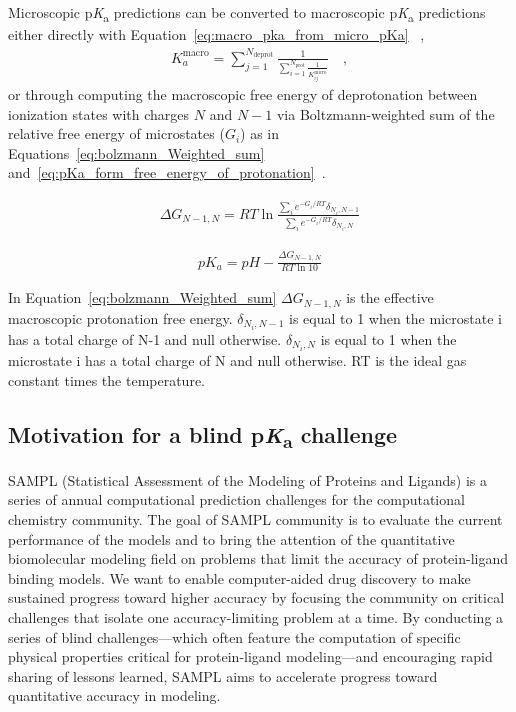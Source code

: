 \documentclass[9pt,lineno,final]{elife}
\newcommand{\pKa}{p\textit{K}\textsubscript{a}}
\begin{document}
Microscopic \pKa{} predictions can be converted to macroscopic \pKa{} predictions either directly with Equation~\ref{eq:macro_pka_from_micro_pKa} ~\citep{Bochevarov:2016:J.Chem.TheoryComput.a},
\begin{align}
 K_a^\text{macro} = \sum_{j=1}^{N_\text{deprot}} \frac{1}{\sum_{i=1}^{N_\text{prot}}\frac{1}{ K_{ij}^\text{micro}}} \quad, \label{eq:macro_pka_from_micro_pKa}
\end{align}
or through computing the macroscopic free energy of deprotonation between ionization states with charges $N$ and $N-1$ via Boltzmann-weighted sum of the relative free energy of microstates ($G_i$) as in Equations~\ref{eq:bolzmann_Weighted_sum} and~\ref{eq:pKa_form_free_energy_of_protonation}~\citep{Selwa:2018:J.Comput.AidedMol.Des.}.

\begin{align}
  \Delta G_{N-1, N} = RT \ln{\frac{\sum_i e^{-G_i/RT} \delta _{N_i, N-1}}{\sum_i e^{-G_i/RT} \delta _{N_i, N}}}
  \label{eq:bolzmann_Weighted_sum}
\end{align}

\begin{align}
  pK_a = pH - \frac{\Delta G_{N-1, N}}{RT \ln{10}}
  \label{eq:pKa_form_free_energy_of_protonation}
\end{align}

In Equation~\ref{eq:bolzmann_Weighted_sum} $\Delta G_{N-1, N}$ is the effective macroscopic
protonation free energy.  $\delta _{N_i, N-1}$ is equal to 1 when the microstate i has a total charge of N-1 and null otherwise. 
$\delta _{N_i, N}$ is equal to 1 when the microstate i has a total charge of N and null otherwise. RT is the ideal gas constant times the temperature.


\subsection{Motivation for a blind \pKa{} challenge}

SAMPL (Statistical Assessment of the Modeling of Proteins and Ligands) is a series of annual computational prediction challenges for the computational chemistry community. 
The goal of SAMPL community is to evaluate the current performance of the models and to bring the attention of the quantitative biomolecular modeling field on problems that limit the accuracy of protein-ligand binding models. 
We want to enable computer-aided drug discovery to make sustained progress toward higher accuracy by focusing the community on critical challenges that isolate one accuracy-limiting problem at a time.
By conducting a series of blind challenges---which often feature the computation of specific physical properties critical for protein-ligand modeling---and encouraging rapid sharing of lessons learned, SAMPL aims to accelerate progress toward quantitative accuracy in modeling.
\end{document}

